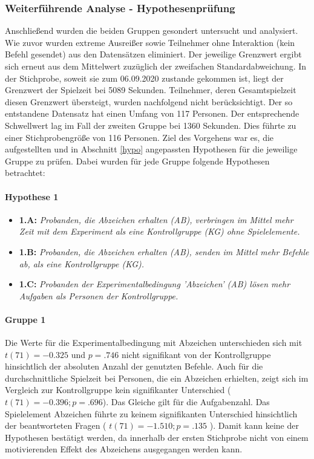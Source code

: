 \subsubsection{Weiterführende Analyse - Hypothesenprüfung}


Anschließend wurden die beiden Gruppen gesondert untersucht und analysiert. Wie zuvor wurden extreme Ausreißer sowie Teilnehmer ohne Interaktion (kein Befehl gesendet) aus den Datensätzen eliminiert. Der jeweilige Grenzwert ergibt sich erneut aus dem Mittelwert zuzüglich der zweifachen Standardabweichung. In der Stichprobe, soweit sie zum 06.09.2020 zustande gekommen ist, liegt der Grenzwert der Spielzeit bei 5089 Sekunden. Teilnehmer, deren Gesamtspielzeit diesen Grenzwert übersteigt, wurden nachfolgend nicht berücksichtigt. Der so entstandene Datensatz hat einen Umfang von 117 Personen. Der entsprechende Schwellwert lag im Fall der zweiten Gruppe bei 1360 Sekunden. Dies führte zu einer Stichprobengröße von 116 Personen. Ziel des Vorgehens war es, die aufgestellten und in Abschnitt \ref{hypo} angepassten Hypothesen für die jeweilige Gruppe zu prüfen. Dabei wurden für jede Gruppe folgende Hypothesen betrachtet:

\paragraph{Hypothese 1}
\begin{itemize}
    \item \textbf{1.A:} \textit{Probanden, die Abzeichen erhalten (AB), verbringen im Mittel mehr Zeit mit dem Experiment als eine Kontrollgruppe (KG) ohne Spielelemente.}
    \item \textbf{1.B:} \textit{Probanden, die Abzeichen erhalten (AB), senden im Mittel mehr Befehle ab, als eine Kontrollgruppe (KG).}
    \item \textbf{1.C:} \textit{Probanden der Experimentalbedingung 'Abzeichen' (AB) lösen mehr Aufgaben als Personen der Kontrollgruppe.} 
\end{itemize}

\paragraph{Gruppe 1}
Die Werte für die Experimentalbedingung mit Abzeichen unterschieden sich mit $ t(71)=-0.325 $ und $p=.746$ nicht signifikant von der Kontrollgruppe hinsichtlich der absoluten Anzahl der genutzten Befehle. Auch für die durchschnittliche Spielzeit bei Personen, die ein Abzeichen erhielten, zeigt sich im Vergleich zur Kontrollgruppe kein signifikanter Unterschied ($t(71)=-0.396; p=.696$). Das Gleiche gilt für die Aufgabenzahl. Das Spielelement Abzeichen führte zu keinem signifikanten Unterschied hinsichtlich der beantworteten Fragen ( $ t(71)=-1.510; p=.135 $ ). Damit kann keine der Hypothesen bestätigt werden, da innerhalb der ersten Stichprobe nicht von einem motivierenden Effekt des Abzeichens ausgegangen werden kann.

